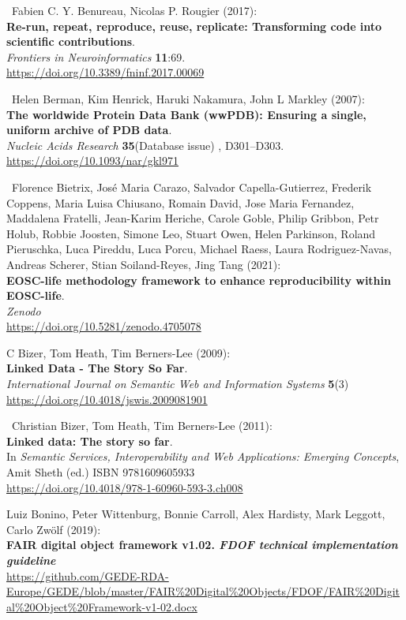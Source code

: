 \begin{thebibliography}{9}
~Fabien C. Y. Benureau, Nicolas P. Rougier (2017):\\
\textbf{Re-run, repeat, reproduce, reuse, replicate: Transforming code
into scientific contributions}.\\
\emph{Frontiers in Neuroinformatics} \textbf{11}:69.\\
\url{https://doi.org/10.3389/fninf.2017.00069}

~Helen Berman, Kim Henrick, Haruki Nakamura, John L Markley
(2007):\\
\textbf{The worldwide Protein Data Bank (wwPDB): Ensuring a single,
uniform archive of PDB data}.\\
\emph{Nucleic Acids Research} \textbf{35}(Database issue) ,
D301--D303.\\
\url{https://doi.org/10.1093/nar/gkl971}

~Florence Bietrix, José Maria Carazo, Salvador
Capella-Gutierrez, Frederik Coppens, Maria Luisa Chiusano, Romain David,
Jose Maria Fernandez, Maddalena Fratelli, Jean-Karim Heriche, Carole
Goble, Philip Gribbon, Petr Holub, Robbie Joosten, Simone Leo, Stuart
Owen, Helen Parkinson, Roland Pieruschka, Luca Pireddu, Luca Porcu,
Michael Raess, Laura Rodriguez-Navas, Andreas Scherer, Stian
Soiland-Reyes, Jing Tang (2021):\\
\textbf{EOSC-life methodology framework to enhance reproducibility
within EOSC-life}.\\
\emph{Zenodo}\\
\url{https://doi.org/10.5281/zenodo.4705078}

 C Bizer, Tom Heath, Tim Berners-Lee (2009):\\
\textbf{Linked Data - The Story So Far}.\\
\emph{International Journal on Semantic Web and Information Systems}
\textbf{5}(3)\\
\url{https://doi.org/10.4018/jswis.2009081901}

~Christian Bizer, Tom Heath, Tim Berners-Lee (2011):\\
\textbf{Linked data: The story so far}.\\
In \emph{Semantic Services, Interoperability and Web Applications:
Emerging Concepts}, Amit Sheth (ed.) ISBN 9781609605933\\
\url{https://doi.org/10.4018/978-1-60960-593-3.ch008}

Luiz Bonino, Peter Wittenburg, Bonnie Carroll, Alex
Hardisty, Mark Leggott, Carlo Zwölf (2019):\\
\textbf{FAIR digital object framework v1.02. \emph{FDOF technical
implementation guideline}}\\
\url{https://github.com/GEDE-RDA-Europe/GEDE/blob/master/FAIR\%20Digital\%20Objects/FDOF/FAIR\%20Digital\%20Object\%20Framework-v1-02.docx}


\end{thebibliography}
